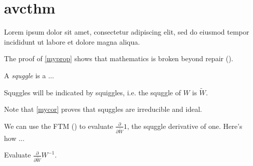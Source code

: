 \newpage
\section*{avcthm}\indent

Lorem ipsum dolor sit amet, consectetur adipiscing elit, sed do eiusmod tempor incididunt ut labore et dolore magna aliqua.
\begin{prop}
\label{myprop}
\end{prop}
The proof of \cref{myprop} shows that mathematics is broken beyond repair ().

\begin{dfn}
A \textit{squggle} is a ...
\end{dfn}

\begin{ntt}
Squggles will be indicated by squiggles, i.e. the squggle of $W$ is $\widetilde{W}$.
\end{ntt}

\begin{lem}
\end{lem}

\begin{thm}
\label{mythm}
\end{thm}

\begin{cor}
\label{mycor}
\end{cor}

\begin{rmk}
Note that \cref{mycor} proves that squggles are irreducible and ideal.
\end{rmk}

\begin{ex}
We can use the FTM () to evaluate $\displaystyle\frac{\partial}{\partial \widetilde{W}}1$, the squggle derivative of one.  Here's how ...
\end{ex}

\begin{prob}
Evaluate $\displaystyle\frac{\partial}{\partial \widetilde{W}}W^{-1}$.
\end{prob}

